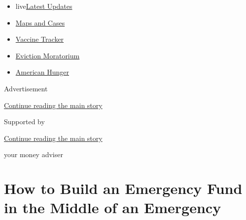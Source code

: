 \begin{itemize}
\tightlist
\item
  live\href{https://www.nytimes3xbfgragh.onion/2020/09/05/world/coronavirus-covid.html?name=styln-coronavirus-national\&region=TOP_BANNER\&block=storyline_menu_recirc\&action=click\&pgtype=Article\&impression_id=f32f8f31-efb9-11ea-a193-7f67ec27f149\&variant=undefined}{Latest
  Updates}
\item
  \href{https://www.nytimes3xbfgragh.onion/interactive/2020/us/coronavirus-us-cases.html?name=styln-coronavirus-national\&region=TOP_BANNER\&block=storyline_menu_recirc\&action=click\&pgtype=Article\&impression_id=f32f8f32-efb9-11ea-a193-7f67ec27f149\&variant=undefined}{Maps
  and Cases}
\item
  \href{https://www.nytimes3xbfgragh.onion/interactive/2020/science/coronavirus-vaccine-tracker.html?name=styln-coronavirus-national\&region=TOP_BANNER\&block=storyline_menu_recirc\&action=click\&pgtype=Article\&impression_id=f32f8f33-efb9-11ea-a193-7f67ec27f149\&variant=undefined}{Vaccine
  Tracker}
\item
  \href{https://www.nytimes3xbfgragh.onion/2020/09/02/your-money/eviction-moratorium-covid.html?name=styln-coronavirus-national\&region=TOP_BANNER\&block=storyline_menu_recirc\&action=click\&pgtype=Article\&impression_id=f32f8f34-efb9-11ea-a193-7f67ec27f149\&variant=undefined}{Eviction
  Moratorium}
\item
  \href{https://www.nytimes3xbfgragh.onion/interactive/2020/09/02/magazine/food-insecurity-hunger-us.html?name=styln-coronavirus-national\&region=TOP_BANNER\&block=storyline_menu_recirc\&action=click\&pgtype=Article\&impression_id=f32f8f35-efb9-11ea-a193-7f67ec27f149\&variant=undefined}{American
  Hunger}
\end{itemize}

Advertisement

\protect\hyperlink{after-top}{Continue reading the main story}

Supported by

\protect\hyperlink{after-sponsor}{Continue reading the main story}

your money adviser

\hypertarget{how-to-build-an-emergency-fund-in-the-middle-of-an-emergency}{%
\section{How to Build an Emergency Fund in the Middle of an
Emergency}\label{how-to-build-an-emergency-fund-in-the-middle-of-an-emergency}}

